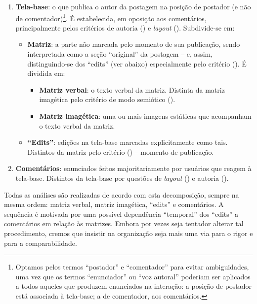 \documentclass{textolivre}
\begin{document}
\begin{enumerate}[label=\alph*.]
\item \textbf{Tela-base}: o que publica o autor da postagem na posição de postador (e não de comentador)\footnote{Optamos pelos termos “postador” e “comentador” para evitar ambiguidades, uma vez que os termos “enunciador” ou “voz autoral” poderiam ser aplicados a todos aqueles que produzem enunciados na interação: a posição de postador está associada à tela-base; a de comentador, aos comentários.}. É estabelecida, em oposição aos comentários, principalmente pelos critérios de autoria () e \textit{layout} (). Subdivide-se em:
    \begin{itemize}
    \item \textbf{Matriz}: a parte não marcada pelo momento de sua publicação, sendo interpretada como a seção “original” da postagem – e, assim, distinguindo-se dos “edits” (ver abaixo) especialmente pelo critério (). É dividida em:
    \begin{itemize}
        \item \textbf{Matriz verbal}: o texto verbal da matriz. Distinta da matriz imagética pelo critério de modo semiótico ().
        \item \textbf{Matriz imagética}: uma ou mais imagens estáticas que acompanham o texto verbal da matriz.
    \end{itemize}
    \item \textbf{“Edits”}: edições na tela-base marcadas explicitamente como tais. Distintos da matriz pelo critério () – momento de publicação.
    \end{itemize}
\item \textbf{Comentários}: enunciados feitos majoritariamente por usuários que reagem à tela-base. Distintos da tela-base por questões de \textit{layout} () e autoria ().
\end{enumerate}

Todas as análises são realizadas de acordo com esta decomposição, sempre na mesma ordem: matriz verbal, matriz imagética, “edits” e comentários. A sequência é motivada por uma possível dependência “temporal” dos “edits” a comentários em relação às matrizes. Embora por vezes seja tentador alterar tal procedimento, cremos que insistir na organização seja mais uma via para o rigor e para a comparabilidade.
\end{document}
